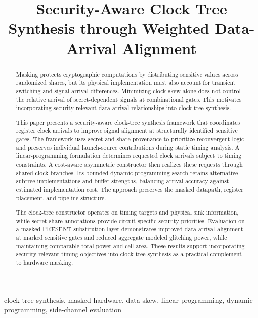 \documentclass[conference]{IEEEtran}
\begin{document}
\title{Security-Aware Clock Tree Synthesis through Weighted Data-Arrival Alignment}
\author{
}
\maketitle
\begin{abstract}
Masking protects cryptographic computations by distributing
sensitive values across randomized shares, but its physical
implementation must also account for transient switching and
signal-arrival differences. Minimizing clock skew alone does
not control the relative arrival of secret-dependent signals
at combinational gates. This motivates incorporating
security-relevant data-arrival relationships into clock-tree
synthesis.

This paper presents a security-aware clock-tree synthesis
framework that coordinates register clock arrivals to improve
signal alignment at structurally identified sensitive gates.
The framework uses secret and share provenance to prioritize
reconvergent logic and preserves individual launch-source
contributions during static timing analysis. A linear-programming
formulation determines requested clock arrivals subject to
timing constraints. A cost-aware asymmetric constructor then
realizes these requests through shared clock branches. Its
bounded dynamic-programming search retains alternative subtree
implementations and buffer strengths, balancing arrival accuracy
against estimated implementation cost. The approach preserves
the masked datapath, register placement, and pipeline structure.

The clock-tree constructor operates on timing targets and
physical sink information, while secret-share annotations
provide circuit-specific security priorities. Evaluation on a masked PRESENT
substitution layer demonstrates improved data-arrival
alignment at marked sensitive gates and reduced aggregate
modeled glitching power, while maintaining comparable total
power and cell area. These results support incorporating
security-relevant timing objectives into clock-tree synthesis
as a practical complement to hardware masking.
\end{abstract}
\begin{IEEEkeywords}
clock tree synthesis, masked hardware, data skew, linear programming, dynamic programming, side-channel evaluation
\end{IEEEkeywords}
\end{document}
